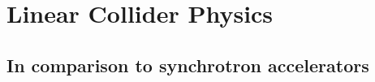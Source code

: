 \chapter{Linear Collider Physics}
\label{LinearColliderPhysics}
\section{In comparison to synchrotron accelerators}
\label{ComparisonSynchrotons}
